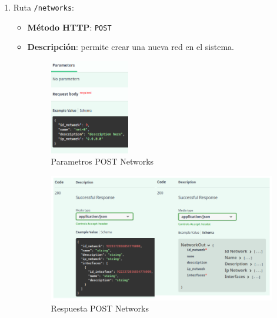 \documentclass[a4paper, oneside, 12pt]{book}
\begin{document}
\begin{enumerate}
		\pagebreak
	
		\item Ruta \texttt{/networks}:
		
		\begin{itemize}
			\item \textbf{Método HTTP}: \texttt{POST}
			\item \textbf{Descripción}: permite crear una nueva red en el sistema.
			
			\begin{figure}[h!]
				\begin{center}
					\includegraphics[width=0.35\textwidth]{img/parameters_post_networks.png}
					\caption{Parametros POST Networks}
					\label{img: parameters post networks}
				\end{center}
			\end{figure}
			
			\begin{figure}[h!]
				\begin{center}
					\includegraphics[width=1\textwidth]{diag/response_post_networks.png}
					\caption{Respuesta POST Networks}
					\label{img: response post networks}
				\end{center}
			\end{figure}
		\end{itemize}
	

\end{enumerate}
\end{document}
